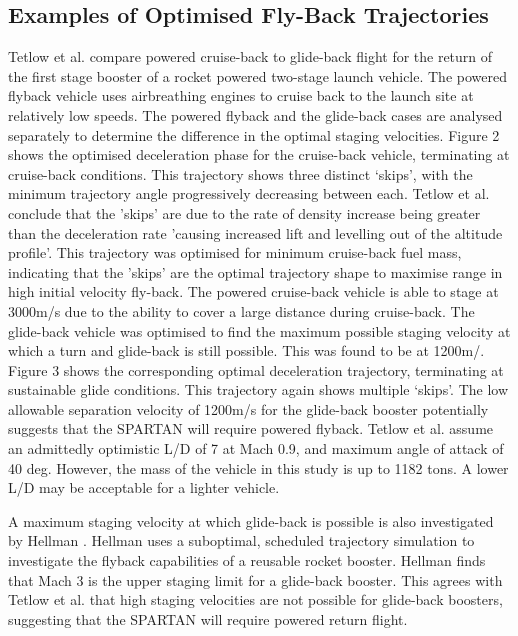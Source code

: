 \subsection{Examples of Optimised Fly-Back Trajectories}

Tetlow et al. \cite{Tetlow1992} compare powered cruise-back to glide-back flight for the return of the first stage booster of a rocket powered two-stage launch vehicle. The powered flyback vehicle uses airbreathing engines to cruise back to the launch site at relatively low speeds. The powered flyback and the glide-back cases are analysed separately to determine the difference in the optimal staging velocities. Figure 2 shows the optimised deceleration phase for the cruise-back vehicle, terminating at cruise-back conditions. This trajectory shows three distinct ‘skips’, with the minimum trajectory angle progressively decreasing between each. Tetlow et al. conclude that the 'skips' are due to the rate of density increase being greater than the deceleration rate 'causing increased lift and levelling out of the altitude profile'\cite{Tetlow1992}. This trajectory was optimised for minimum cruise-back fuel mass, indicating that the 'skips' are the optimal trajectory shape to maximise range in high initial velocity fly-back. The powered cruise-back vehicle is able to stage at 3000m/s due to the ability to cover a large distance during cruise-back. 
The glide-back vehicle was optimised to find the maximum possible staging velocity at which a turn and glide-back is still possible. This was found to be at 1200m/. Figure 3 shows the corresponding optimal deceleration trajectory, terminating at sustainable glide conditions. This trajectory again shows multiple ‘skips’. The low allowable separation velocity of 1200m/s for the glide-back booster potentially suggests that the SPARTAN will require powered flyback. 
Tetlow et al. assume an admittedly optimistic L/D of 7 at Mach 0.9, and maximum angle of attack of 40 deg. However, the mass of the vehicle in this study is up to 1182 tons. A lower L/D may be acceptable for a lighter vehicle.  

A maximum staging velocity at which glide-back is possible is also investigated by Hellman \cite{Hellman}. Hellman uses a suboptimal, scheduled trajectory simulation to investigate the flyback capabilities of a reusable rocket booster. Hellman finds that Mach 3 is the upper staging limit for a glide-back booster. This agrees with Tetlow et al. that high staging velocities are not possible for glide-back boosters, suggesting that the SPARTAN will require powered return flight.

